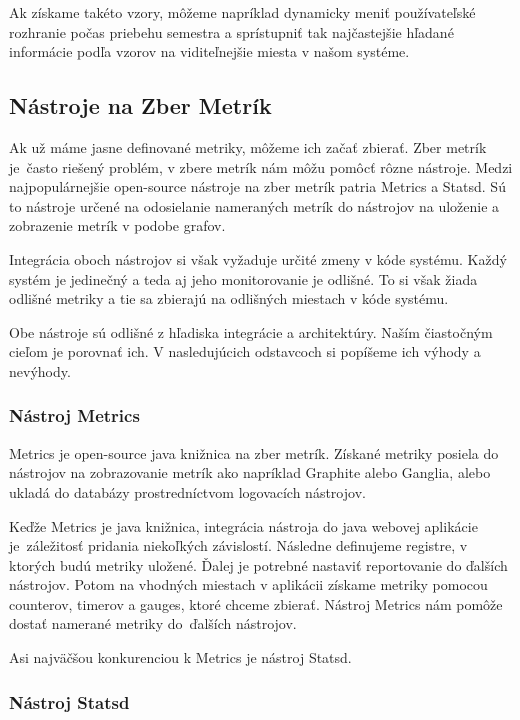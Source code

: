 \documentclass[a4paper, usesections, upjsfrontpage, disablespecwarning, thesismargins, thesislinespacing]{rnthesissvk}
\begin{document}
Ak získame takéto vzory, môžeme napríklad dynamicky meniť používateľské rozhranie počas priebehu semestra a sprístupniť tak najčastejšie hľadané informácie podľa vzorov na viditeľnejšie miesta v našom systéme.


\subsection{Nástroje na Zber Metrík}

Ak už máme jasne definované metriky, môžeme ich začať zbierať.
Zber metrík je~často riešený problém, v zbere metrík nám môžu pomôcť rôzne nástroje.
Medzi naj\-populár\-nejšie open-source nástroje na zber metrík patria Metrics a Statsd.
Sú to nástroje určené na odosielanie nameraných metrík do nástrojov na uloženie a zobrazenie metrík v podobe grafov.

Integrácia oboch nástrojov si však vyžaduje určité zmeny v kóde systému.
Každý systém je jedinečný a teda aj jeho monitorovanie je odlišné.
To si však žiada odlišné metriky a tie sa zbierajú na odlišných miestach v kóde systému.

Obe nástroje sú odlišné z hľadiska integrácie a architektúry.
Naším čiastočným cieľom je porovnať ich.
V nasledujúcich odstavcoch si popíšeme ich výhody a nevýhody.

\subsubsection{Nástroj Metrics}


\noindent
Metrics je open-source java knižnica na zber metrík.
Získané metriky posiela do nástrojov na zobrazovanie metrík ako napríklad Graphite alebo Ganglia, alebo ukladá do databázy prostredníctvom logovacích nástrojov.

Keďže Metrics je java knižnica, integrácia nástroja do java webovej aplikácie je~záležitosť pridania niekoľkých závislostí.
Následne definujeme registre, v ktorých budú metriky uložené.
Ďalej je potrebné nastaviť reportovanie do ďalších nástrojov.
Potom na vhodných miestach v aplikácii získame metriky pomocou counterov, timerov a gauges, ktoré chceme zbierať.
Nástroj Metrics nám pomôže dostať namerané metriky do~ďalších nástrojov.

Asi najväčšou konkurenciou k Metrics je nástroj Statsd.


\subsubsection{Nástroj Statsd}
\end{document}
